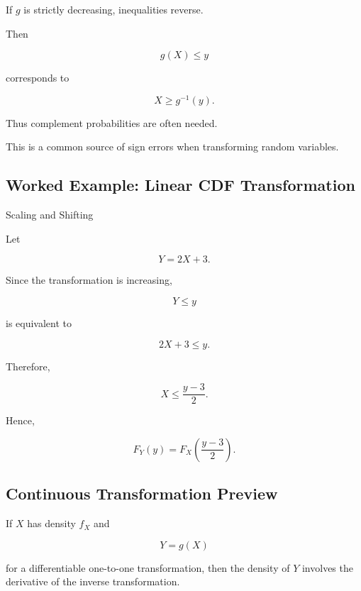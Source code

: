If \(g\) is strictly decreasing, inequalities reverse.

Then

\[
g(X)\leq y
\]

corresponds to

\[
X\geq g^{-1}(y).
\]

Thus complement probabilities are often needed.

This is a common source of sign errors when transforming random
variables.

\subsection{Worked Example: Linear CDF Transformation}
\label{subsec:worked-linear-cdf-transform}

\begin{workedexamplebox}{Scaling and Shifting}

Let

\[
Y=2X+3.
\]

Since the transformation is increasing,

\[
Y\leq y
\]

is equivalent to

\[
2X+3\leq y.
\]

Therefore,

\[
X\leq\frac{y-3}{2}.
\]

Hence,

\begin{answerbox}
\[
\boxed{
F_Y(y)
=
F_X\left(
\frac{y-3}{2}
\right).
}
\]
\end{answerbox}

\end{workedexamplebox}

\subsection{Continuous Transformation Preview}
\label{subsec:continuous-transformation-preview}

If \(X\) has density \(f_X\) and

\[
Y=g(X)
\]

for a differentiable one-to-one transformation, then the density of
\(Y\) involves the derivative of the inverse transformation.

